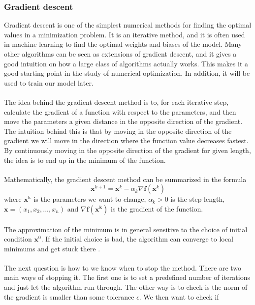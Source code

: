 \subsubsection{Gradient descent}
Gradient descent is one of the simplest numerical methods for finding the optimal values in a minimization problem. It is an iterative method, and it is often used in machine learning to find the optimal weights and biases of the model. Many other algorithms can be seen as extensions of gradient descent, and it gives a good intuition on how a large class of algorithms actually works. This makes it a good starting point in the study of numerical optimization. In addition, it will be used to train our model later.
\\
\\
The idea behind the gradient descent method is to, for each iterative step, calculate the gradient of a function with respect to the parameters, and then move the parameters a given distance in the opposite direction \cite{NumOpt} of the gradient. The intuition behind this is that by moving in the opposite direction of the gradient we will move in the direction where the function value decreases fastest. By continuously moving in the opposite direction of the gradient for given length, the idea is to end up in the minimum of the function. 
\\
\\
Mathematically, the gradient descent method can be summarized in the formula
\begin{equation}
    \boldsymbol{x}^{k+1} = \boldsymbol{x}^k - \alpha_k \nabla \boldsymbol{f}(\boldsymbol{x}^k)
\end{equation}
where $\boldsymbol{x^k}$ is the parameters we want to change, $\alpha_k > 0$ is the step-length, $\boldsymbol{x} = (x_1, x_2,...,x_n)$ and $\nabla \boldsymbol{f}(\boldsymbol{x^k})$ is the gradient of the function. 
\\
\\
The approximation of the minimum is in general sensitive to the choice of initial condition $\boldsymbol{x}^0$. If the initial choice is bad, the algorithm can converge to local minimums and get stuck there \cite{NumOpt}. 
\\
\\
The next question is how to we know when to stop the method. There are two main ways of stopping it. The first one is to set a predefined number of iterations and just let the algorithm run through. The other way is to check is the norm of the gradient is smaller than some tolerance $\epsilon$. We then want to check if
